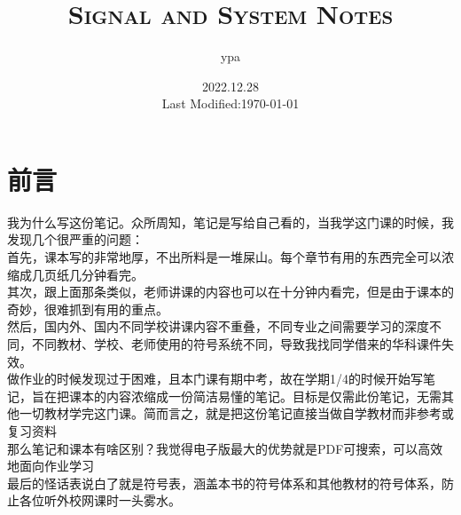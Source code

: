 \documentclass{article}
\title{\textsc{Signal and System Notes}}
\author{ypa}
\date{2022.12.28\\%
Last Modified:\today}
\begin{document}
\maketitle
\section{前言}
我为什么写这份笔记。众所周知，笔记是写给自己看的，当我学这门课的时候，我发现几个很严重的问题：\\
首先，课本写的非常地厚，不出所料是一堆{\red 屎山}。每个章节有用的东西完全可以浓缩成几页纸几分钟看完。\\
其次，跟上面那条类似，老师讲课的内容也可以在十分钟内看完，但是由于课本的奇妙，很难抓到有用的重点。\\
然后，国内外、国内不同学校{\red 讲课内容不重叠}，不同专业之间需要学习的深度不同，不同教材、学校、老师使用的符号系统不同，导致我找同学借来的华科课件失效。\\
做作业的时候发现过于困难，且本门课有期中考，故在学期1/4的时候开始写笔记，旨在把课本的内容浓缩成一份简洁易懂的笔记。目标是{\red 仅需}此份笔记，无需其他一切教材学完这门课。简而言之，就是把这份笔记直接当做{\red 自学教材}而非参考或复习资料\\
那么笔记和课本有啥区别？我觉得电子版最大的优势就是{\red PDF可搜索}，可以高效地{\red 面向作业学习}\\
最后的怪话表说白了就是符号表，涵盖本书的符号体系和其他教材的符号体系，防止各位听外校网课时一头雾水。

\end{document}
